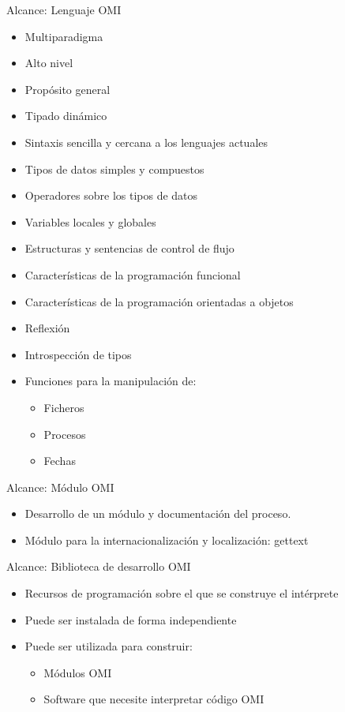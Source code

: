 \documentclass[spanish]{beamer}
\begin{document}
\begin{frame}{Alcance: Lenguaje OMI}
    \begin{itemize}
      \item Multiparadigma 
      \item Alto nivel
      \item Propósito general
      \item Tipado dinámico
      \item Sintaxis sencilla y cercana a los lenguajes actuales
      \item Tipos de datos simples y compuestos
      \item Operadores sobre los tipos de datos
      \item Variables locales y globales
      \item Estructuras y sentencias de control de flujo
      \item Características de la programación funcional
      \item Características de la programación orientadas a objetos
      \item Reflexión
      \item Introspección de tipos
      \item Funciones para la manipulación de:
      \begin{itemize}
         \item Ficheros
          \item Procesos
          \item Fechas
      \end{itemize}
   \end{itemize}
\end{frame}

\begin{frame}{Alcance: Módulo OMI}
    \begin{itemize}
      \item Desarrollo de un módulo y documentación del proceso.
      \item Módulo para la internacionalización y localización: gettext
   \end{itemize}
\end{frame}

\begin{frame}{Alcance: Biblioteca de desarrollo OMI}
    \begin{itemize}
      \item Recursos de programación sobre el que se construye el intérprete
      \item Puede ser instalada de forma independiente
      \item Puede ser utilizada para construir:
      \begin{itemize}
         \item Módulos OMI
         \item Software que necesite interpretar código OMI
      \end{itemize}
   \end{itemize}
\end{frame}
\end{document}
